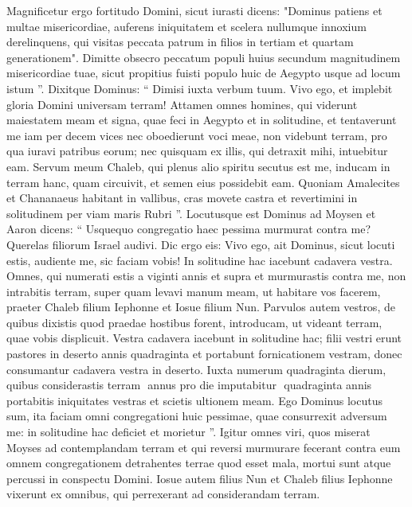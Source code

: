 \begin{biblechapter}
\begin{biblechapter}
\begin{biblechapter}
\begin{biblechapter}
\begin{biblechapter}
\begin{biblechapter}
\begin{biblechapter}
\begin{biblechapter}
\begin{biblechapter}
\begin{biblechapter}
\begin{biblechapter}
\begin{biblechapter}
\begin{biblechapter}
\begin{biblechapter}
\verse Magnificetur ergo fortitudo Domini, sicut iurasti dicens: 
\verse "Dominus patiens et multae misericordiae, auferens iniquitatem et scelera nullumque innoxium derelinquens, qui visitas peccata patrum in filios in tertiam et quartam generationem". 
\verse Dimitte obsecro peccatum populi huius secundum magnitudinem misericordiae tuae, sicut propitius fuisti populo huic de Aegypto usque ad locum istum ”.
 \verse Dixitque Dominus: “ Dimisi iuxta verbum tuum. 
\verse Vivo ego, et implebit gloria Domini universam terram! 
\verse Attamen omnes homines, qui viderunt maiestatem meam et signa, quae feci in Aegypto et in solitudine, et tentaverunt me iam per decem vices nec oboedierunt voci meae, 
\verse non videbunt terram, pro qua iuravi patribus eorum; nec quisquam ex illis, qui detraxit mihi, intuebitur eam. 
\verse Servum meum Chaleb, qui plenus alio spiritu secutus est me, inducam in terram hanc, quam circuivit, et semen eius possidebit eam. 
\verse Quoniam Amalecites et Chananaeus habitant in vallibus, cras movete castra et revertimini in solitudinem per viam maris Rubri ”.
 \verse Locutusque est Dominus ad Moysen et Aaron dicens: 
\verse “ Usquequo congregatio haec pessima murmurat contra me? Querelas filiorum Israel audivi. 
 \verse Dic ergo eis: Vivo ego, ait Dominus, sicut locuti estis, audiente me, sic faciam vobis! 
\verse In solitudine hac iacebunt cadavera vestra. Omnes, qui numerati estis a viginti annis et supra et murmurastis contra me, 
\verse non intrabitis terram, super quam levavi manum meam, ut habitare vos facerem, praeter Chaleb filium Iephonne et Iosue filium Nun. 
\verse Parvulos autem vestros, de quibus dixistis quod praedae hostibus forent, introducam, ut videant terram, quae vobis displicuit. 
\verse Vestra cadavera iacebunt in solitudine hac; 
\verse filii vestri erunt pastores in deserto annis quadraginta et portabunt fornicationem vestram, donec consumantur cadavera vestra in deserto. 
\verse Iuxta numerum quadraginta dierum, quibus considerastis terram ­ annus pro die imputabitur ­ quadraginta annis portabitis iniquitates vestras et scietis ultionem meam. 
 \verse Ego Dominus locutus sum, ita faciam omni congregationi huic pessimae, quae consurrexit adversum me: in solitudine hac deficiet et morietur ”.
 \verse Igitur omnes viri, quos miserat Moyses ad contemplandam terram et qui reversi murmurare fecerant contra eum omnem congregationem detrahentes terrae quod esset mala, 
\verse mortui sunt atque percussi in conspectu Domini. 
\verse Iosue autem filius Nun et Chaleb filius Iephonne vixerunt ex omnibus, qui perrexerant ad considerandam terram.

\end{biblechapter}
\end{biblechapter}
\end{biblechapter}
\end{biblechapter}
\end{biblechapter}
\end{biblechapter}
\end{biblechapter}
\end{biblechapter}
\end{biblechapter}
\end{biblechapter}
\end{biblechapter}
\end{biblechapter}
\end{biblechapter}
\end{biblechapter}
